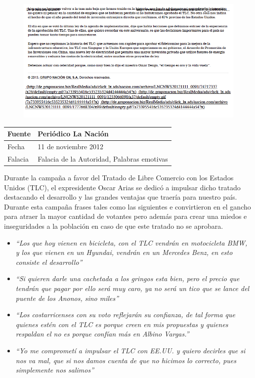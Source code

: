 \documentclass[times]{simauth}
\begin{document}
\begin{figure}[h!]
    \centering
    \includegraphics[width=16cm]{oscar-arias-bmw-2}
    \label{fig:falacia9-2}
\end{figure}

\begin{table}[h!]
    \begin{tabular}{ll} 
        \toprule[1.5pt]
        Fuente & Periódico La Nación\\
        \midrule[0.5pt]
        Fecha  & 11 de noviembre 2012\\
        \midrule[0.5pt]
        Falacia & Falacia de la Autoridad, Palabras emotivas \\
        \bottomrule[1.5pt]
    \end{tabular} 
\end{table}

Durante la campaña a favor del Tratado de Libre Comercio con los Estados Unidos (TLC), el expresidente Oscar Arias se dedicó a impulsar dicho tratado destacando el desarrollo y las grandes ventajas que traería para nuestro país. Durante esta campaña frases tales como las siguientes e convirtieron en el gancho para atraer la mayor cantidad de votantes pero además para crear una miedos e inseguridades a la población en caso de que este tratado no se aprobara.

\begin{itemize}
    \item
     \textit{``Los que hoy vienen en bicicleta, con el TLC vendrán en motocicleta BMW, y los que vienen en un Hyundai, vendrán en un Mercedes Benz, en esto consiste el desarrollo''}
     \item
     \textit{``Si quieren darle una cachetada a los gringos esta bien, pero el precio que tendrán que pagar por ello será muy caro, ya no será un tico que se lance del puente de los Anonos, sino miles''}
     \item
     \textit{``Los costarricenses con su voto reflejarán su confianza, de tal forma que quienes estén con el TLC es porque creen en mis propuestas y quienes respaldan el no es porque confían más en Albino Vargas.''}
     \item
     \textit{``Yo me comprometí a impulsar el TLC con EE.UU. y quiero decirles que si nos va mal, que si nos damos cuenta de que no hicimos lo correcto, pues simplemente nos salimos''}
    
\end{itemize}
\end{document}
